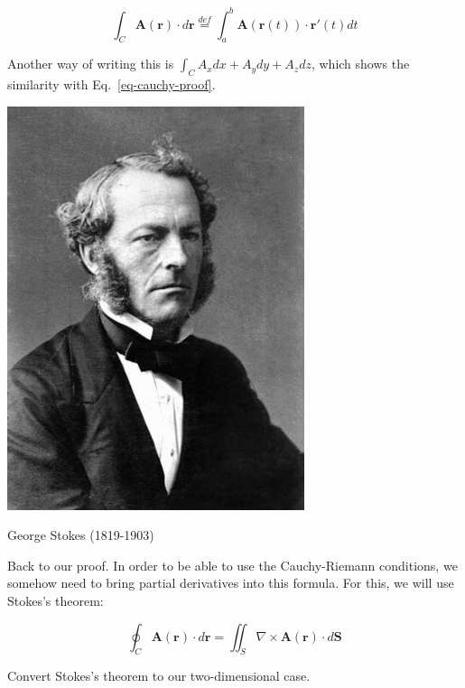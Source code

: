 \begin{equation}
  \int_{C} \mathbf{A}(\mathbf{r})\cdot d\mathbf{r} \stackrel{def}{=} \int_a^b \mathbf{A}\left(\mathbf{r}(t)\right) \cdot  \mathbf{r}'(t) dt
  \label{eq-def-line-integral-vector}
\end{equation}

Another way of writing this is $\int_{C} A_xdx + A_ydy + A_zdz$, which shows the similarity with Eq.~\ref{eq-cauchy-proof}.


\begin{marginfigure}[-0.0cm]
  \includegraphics{complex/figures/stokes}
  \caption{George Stokes (1819-1903)}
\end{marginfigure}

Back to our proof. In order to be able to use the Cauchy-Riemann conditions, we somehow need to bring partial derivatives into this formula. For this, we will use Stokes's theorem:

\begin{equation}
\oint_{{{C}}} {\mathbf A}(\mathbf{r}) \cdot d {\mathbf r} = \iint_S \nabla \times {\mathbf A}(\mathbf{r}) \cdot d {\mathbf S}
\end{equation}

\begin{cue}
Convert Stokes's theorem to our two-dimensional case.
\end{cue}

